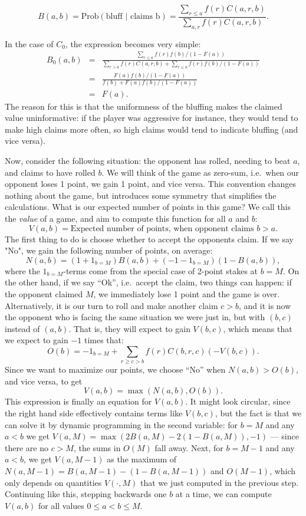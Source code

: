 \documentclass[12pt]{article}
\begin{document}
$$
B(a,b)= \textrm{Prob}(\textrm{bluff } | \textrm{ claims b})
= \frac{\sum_{r \leq a}f(r)C(a,r,b)}{\sum_{a,r}f(r)C(a,r,b)}.
$$

In the case of $C_0$, the expression becomes very simple:
\begin{eqnarray*}
B_0(a,b) &=& \frac{\sum_{r \leq a}f(r)f(b)/(1-F(a))}{\sum_{r > a}f(r)C(a,r,b) + \sum_{r\leq a}f(r)f(b)/(1-F(a))}\\
&=&\frac{F(a)f(b)/(1-F(a))}{f(b) + F(a)f(b)/(1-F(a))}\\
&=& F(a).
\end{eqnarray*}
The reason for this is that the uniformness of the bluffing makes the claimed value uninformative: if the player was aggressive for instance, they would tend to make high claims more often, so high claims would tend to indicate bluffing (and vice versa).

Now, consider the following situation: the opponent has rolled, needing to beat $a$, and claims to have rolled $b$. We will think of the game as zero-sum, i.e.\ when our opponent loses 1 point, we gain 1 point, and vice versa. This convention changes nothing about the game, but introduces some symmetry that simplifies the calculations. What is our expected number of points in this game? We call this the \emph{value} of a game, and aim to compute this function for all $a$ and $b$:
$$
V(a,b) = \textrm{Expected number of points, when opponent claims $b > a$.}
$$
The first thing to do is choose whether to accept the opponents claim. If we say "No", we gain the following number of points, on average:
$$
N(a,b) = (1 + 1_{b = M})B(a,b) + (-1 - 1_{b = M})(1-B(a,b)),
$$
where the $1_{b = M}$-terms come from the special case of 2-point stakes at $b = M$. On the other hand, if we say ``Ok'', i.e.\ accept the claim, two things can happen: if the opponent claimed $M$, we immediately lose 1 point and the game is over. Alternatively, it is our turn to roll and make another claim $c > b$, and it is now the opponent who is facing the same situation we were just in, but with $(b,c)$ instead of $(a,b)$. That is, they will expect to gain $V(b,c)$, which means that we expect to gain $-1$ times that:
$$
O(b) = -1_{b = M} + \sum_{r \geq c > b}f(r)C(b,r,c)(-V(b,c)).
$$
Since we want to maximize our points, we choose ``No'' when $N(a,b) > O(b)$, and vice versa, to get 
$$
V(a,b) = \max\left(N(a,b),O(b)\right).
$$
This expression is finally an equation for $V(a,b)$. It might look circular, since the right hand side effectively contains terms like $V(b,c)$, but the fact is that we can solve it by dynamic programming in the second variable: for $b = M$ and any $a < b$ we get $V(a,M) = \max(2B(a,M) -2(1-B(a,M)),-1)$ --- since there are no $c > M$, the sums in $O(M)$ fall away. Next, for $b = M - 1$ and any $a < b$, we get $V(a,M-1)$ as the maximum of $N(a,M-1) = B(a,M-1) -(1-B(a,M-1))$ and $O(M-1)$, which only depends on quantities $V(\cdot,M)$ that we just computed in the previous step. Continuing like this, stepping backwards one $b$ at a time, we can compute $V(a,b)$ for all values $0 \leq a < b \leq M$.
\end{document}
